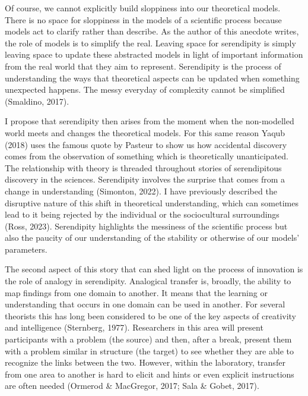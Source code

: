 \documentclass[authordate, commentary]{jote-new-article}
\begin{document}
	Of course, we cannot explicitly build sloppiness into our theoretical models. There is no space for sloppiness in the models of a scientific process because models act to clarify rather than describe. As the author of this anecdote writes, the role of models is to simplify the real. Leaving space for serendipity is simply leaving space to update these abstracted models in light of important information from the real world that they aim to represent. Serendipity is the process of understanding the ways that theoretical aspects can be updated when something unexpected happens. The messy everyday of complexity cannot be simplified (Smaldino, 2017).



	I propose that serendipity then arises from the moment when the non-modelled world meets and changes the theoretical models. For this same reason Yaqub (2018) uses the famous quote by Pasteur to show us how accidental discovery comes from the observation of something which is theoretically unanticipated. The relationship with theory is threaded throughout stories of serendipitous discovery in the sciences. Serendipity involves the surprise that comes from a change in understanding (Simonton, 2022). I have previously described the disruptive nature of this shift in theoretical understanding, which can sometimes lead to it being rejected by the individual or the sociocultural surroundings (Ross, 2023). Serendipity highlights the messiness of the scientific process but also the paucity of our understanding of the stability or otherwise of our models' parameters.



	The second aspect of this story that can shed light on the process of innovation is the role of analogy in serendipity. Analogical transfer is, broadly, the ability to map findings from one domain to another. It means that the learning or understanding that occurs in one domain can be used in another. For several theorists this has long been considered to be one of the key aspects of creativity and intelligence (Sternberg, 1977). Researchers in this area will present participants with a problem (the source) and then, after a break, present them with a problem similar in structure (the target) to see whether they are able to recognize the links between the two. However, within the laboratory, transfer from one area to another is hard to elicit and hints or even explicit instructions are often needed (Ormerod \& MacGregor, 2017; Sala \& Gobet, 2017).
\end{document}
